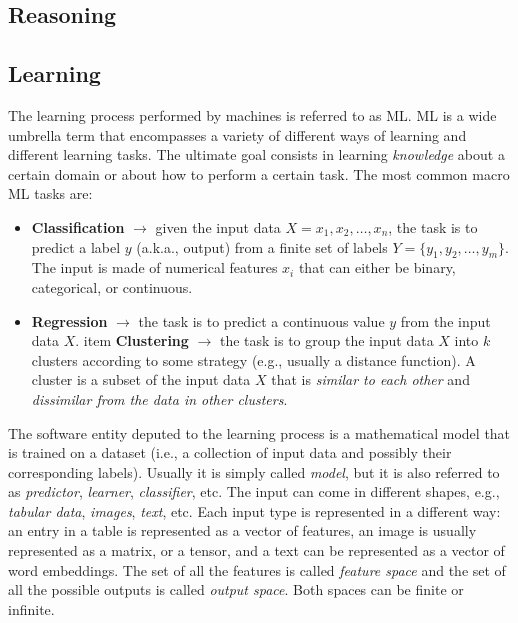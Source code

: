 \subsection{Reasoning}\label{subsec:reasoning}
%

\subsection{Learning}\label{subsec:machine-learning}
%
The learning process performed by machines is referred to as \gls{ML}.
%
\gls{ML} is a wide umbrella term that encompasses a variety of different ways of learning and different learning tasks.
%
The ultimate goal consists in learning \emph{knowledge} about a certain domain or about how to perform a certain task.
%
The most common macro \gls{ML} tasks are:
%
\begin{itemize}
    \item \textbf{Classification} $\rightarrow$ given the input data $X={x_1, x_2, \dots, x_n}$, the task is to predict a label $y$ (a.k.a., output) from a finite set of labels $Y=\{y_1, y_2, \dots, y_m\}$.
    The input is made of numerical features $x_i$ that can either be binary, categorical, or continuous.
    \item \textbf{Regression} $\rightarrow$ the task is to predict a continuous value $y$ from the input data $X$.
    item \textbf{Clustering} $\rightarrow$ the task is to group the input data $X$ into $k$ clusters according to some strategy (e.g., usually a distance function).
    A cluster is a subset of the input data $X$ that is \emph{similar to each other} and \emph{dissimilar from the data in other clusters}.
\end{itemize}

The software entity deputed to the learning process is a mathematical model that is trained on a dataset (i.e., a collection of input data and possibly their corresponding labels).
%
Usually it is simply called \emph{model}, but it is also referred to as \emph{predictor}, \emph{learner}, \emph{classifier}, etc.
%
The input can come in different shapes, e.g., \emph{tabular data}, \emph{images}, \emph{text}, etc.
%
Each input type is represented in a different way: an entry in a table is represented as a vector of features, an image is usually represented as a matrix, or a tensor, and a text can be represented as a vector of word embeddings.
%
The set of all the features is called \emph{feature space} and the set of all the possible outputs is called \emph{output space}.
%
Both spaces can be finite or infinite.
%

